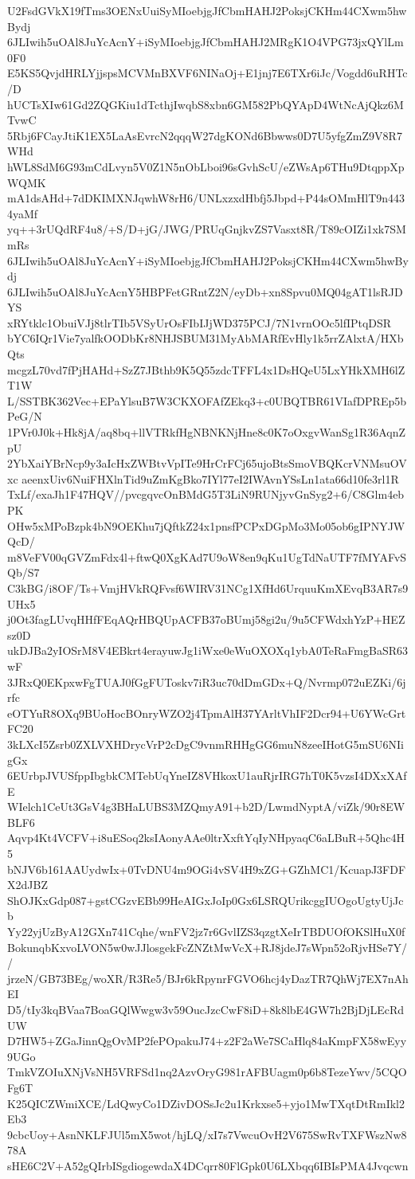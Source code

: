 U2FsdGVkX19fTms3OENxUuiSyMIoebjgJfCbmHAHJ2PoksjCKHm44CXwm5hwBydj
6JLIwih5uOAl8JuYcAcnY+iSyMIoebjgJfCbmHAHJ2MRgK1O4VPG73jxQYlLm0F0
E5KS5QvjdHRLYjjspsMCVMnBXVF6NINaOj+E1jnj7E6TXr6iJc/Vogdd6uRHTc/D
hUCTsXIw61Gd2ZQGKiu1dTcthjIwqbS8xbn6GM582PbQYApD4WtNcAjQkz6MTvwC
5Rbj6FCayJtiK1EX5LaAsEvrcN2qqqW27dgKONd6Bbwws0D7U5yfgZmZ9V8R7WHd
hWL8SdM6G93mCdLvyn5V0Z1N5nObLboi96sGvhScU/eZWsAp6THu9DtqppXpWQMK
mA1dsAHd+7dDKIMXNJqwhW8rH6/UNLxzxdHbfj5Jbpd+P44sOMmHlT9n4434yaMf
yq++3rUQdRF4u8/+S/D+jG/JWG/PRUqGnjkvZS7Vasxt8R/T89cOIZi1xk7SMmRs
6JLIwih5uOAl8JuYcAcnY+iSyMIoebjgJfCbmHAHJ2PoksjCKHm44CXwm5hwBydj
6JLIwih5uOAl8JuYcAcnY5HBPFetGRntZ2N/eyDb+xn8Spvu0MQ04gAT1lsRJDYS
xRYtklc1ObuiVJj8tlrTIb5VSyUrOsFIbIJjWD375PCJ/7N1vrnOOc5lfIPtqDSR
bYC6IQr1Vie7yalfkOODbKr8NHJSBUM31MyAbMARfEvHly1k5rrZAlxtA/HXbQts
mcgzL70vd7fPjHAHd+SzZ7JBthb9K5Q55zdcTFFL4x1DsHQeU5LxYHkXMH6lZT1W
L/SSTBK362Vec+EPaYlsuB7W3CKXOFAfZEkq3+c0UBQTBR61VIafDPREp5bPeG/N
1PVr0J0k+Hk8jA/aq8bq+llVTRkfHgNBNKNjHne8c0K7oOxgvWanSg1R36AqnZpU
2YbXaiYBrNcp9y3aIcHxZWBtvVpITe9HrCrFCj65ujoBtsSmoVBQKcrVNMsuOVxc
aeenxUiv6NuiFHXlnTid9uZmKgBko7IYl77eI2IWAvnYSsLn1ata66d10fe3rl1R
TxLf/exaJh1F47HQV//pvcgqvcOnBMdG5T3LiN9RUNjyvGnSyg2+6/C8Glm4ebPK
OHw5xMPoBzpk4bN9OEKhu7jQftkZ24x1pnsfPCPxDGpMo3Mo05ob6gIPNYJWQcD/
m8VeFV00qGVZmFdx4l+ftwQ0XgKAd7U9oW8en9qKu1UgTdNaUTF7fMYAFvSQb/S7
C3kBG/i8OF/Ts+VmjHVkRQFvsf6WIRV31NCg1XfHd6UrquuKmXEvqB3AR7s9UHx5
j0Ot3fagLUvqHHfFEqAQrHBQUpACFB37oBUmj58gi2u/9u5CFWdxhYzP+HEZsz0D
ukDJBa2yIOSrM8V4EBkrt4erayuwJg1iWxe0eWuOXOXq1ybA0TeRaFmgBaSR63wF
3JRxQ0EKpxwFgTUAJ0fGgFUToskv7iR3uc70dDmGDx+Q/Nvrmp072uEZKi/6jrfc
eOTYuR8OXq9BUoHocBOnryWZO2j4TpmAlH37YArltVhIF2Dcr94+U6YWcGrtFC20
3kLXcI5Zsrb0ZXLVXHDrycVrP2cDgC9vnmRHHgGG6muN8zeeIHotG5mSU6NIigGx
6EUrbpJVUSfppIbgbkCMTebUqYneIZ8VHkoxU1auRjrIRG7hT0K5vzsI4DXxXAfE
WIelch1CeUt3GsV4g3BHaLUBS3MZQmyA91+b2D/LwmdNyptA/viZk/90r8EWBLF6
Aqvp4Kt4VCFV+i8uESoq2ksIAonyAAe0ltrXxftYqIyNHpyaqC6aLBuR+5Qhc4H5
bNJV6b161AAUydwIx+0TvDNU4m9OGi4vSV4H9xZG+GZhMC1/KcuapJ3FDFX2dJBZ
ShOJKxGdp087+gstCGzvEBb99HeAIGxJoIp0Gx6LSRQUrikcggIUOgoUgtyUjJcb
Yy22yjUzByA12GXn741Cqhe/wnFV2jz7r6GvlIZS3qzgtXeIrTBDUOfOKSlHuX0f
BokunqbKxvoLVON5w0wJJlosgekFcZNZtMwVcX+RJ8jdeJ7sWpn52oRjvHSe7Y//
jrzeN/GB73BEg/woXR/R3Re5/BJr6kRpynrFGVO6hcj4yDazTR7QhWj7EX7nAhEI
D5/tIy3kqBVaa7BoaGQlWwgw3v59OucJzcCwF8iD+8k8lbE4GW7h2BjDjLEcRdUW
D7HW5+ZGaJinnQgOvMP2fePOpakuJ74+z2F2aWe7SCaHlq84aKmpFX58wEyy9UGo
TmkVZOIuXNjVsNH5VRFSd1nq2AzvOryG981rAFBUagm0p6b8TezeYwv/5CQOFg6T
K25QICZWmiXCE/LdQwyCo1DZivDOSsJc2u1Krkxse5+yjo1MwTXqtDtRmIkl2Eb3
9cbcUoy+AsnNKLFJUl5mX5wot/hjLQ/xI7s7VwcuOvH2V675SwRvTXFWszNw878A
sHE6C2V+A52gQIrbISgdiogewdaX4DCqrr80FlGpk0U6LXbqq6IBIsPMA4Jvqcwn
